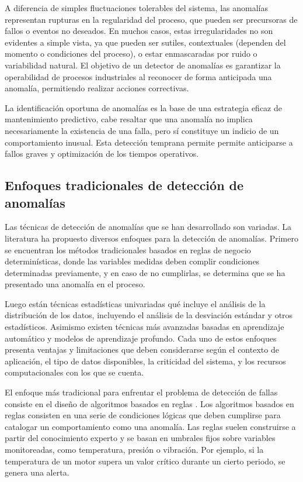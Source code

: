 \documentclass[11pt,a4paper,spanish]{book}
\numberwithin{equation}{chapter}
\numberwithin{figure}{chapter}
\begin{document}
A diferencia de simples fluctuaciones tolerables del sistema, las anomalías 
representan rupturas en la regularidad del proceso, que pueden ser precursoras de 
fallos o eventos no deseados. En muchos casos, estas irregularidades no son evidentes 
a simple vista, ya que pueden ser sutiles, contextuales (dependen del momento o 
condiciones del proceso), o estar enmascaradas por ruido o variabilidad natural.
El objetivo de un detector de anomalías es garantizar la operabilidad de procesos 
industriales al reconocer de forma anticipada una anomalía, permitiendo realizar 
acciones correctivas. 


La identificación oportuna de anomalías es la base de una estrategia eficaz de 
mantenimiento predictivo, cabe resaltar que una anomalía no implica necesariamente
la existencia de una falla, pero sí constituye un indicio de un comportamiento inusual.
Esta detección temprana permite permite anticiparse a fallos graves y optimización de 
los tiempos operativos.

\subsection{Enfoques tradicionales de detección de anomalías}

Las técnicas de detección de anomalías que se han desarrollado son variadas. 
La literatura ha propuesto diversos enfoques para la detección de anomalías. 
Primero se encuentran los métodos tradicionales basados en reglas de negocio 
determinísticas, donde las variables medidas deben complir condiciones determinadas 
previamente, y en caso de no cumplirlas, se determina que se ha presentado una anomalía 
en el proceso. 


Luego están técnicas estadísticas univariadas qué incluye el análisis de la 
distribución de los datos, incluyendo el análisis de la desviación estándar y otros 
estadísticos. 
Asimismo existen técnicas más avanzadas basadas en aprendizaje automático y modelos de 
aprendizaje profundo. 
Cada uno de estos enfoques presenta ventajas y limitaciones que deben considerarse según 
el contexto de aplicación, el tipo de datos disponibles, la criticidad del sistema, y los 
recursos computacionales con los que se cuenta.


El enfoque más tradicional para enfrentar el problema de detección de fallas consiste en 
el diseño de algoritmos basados en reglas \cite{gami2024datacleansing}. Los algoritmos 
basados en reglas consisten en una serie de condiciones lógicas que deben cumplirse para
catalogar un comportamiento como una anomalía. 
Las reglas suelen construirse a partir del 
conocimiento experto y se basan en umbrales fijos sobre variables monitoreadas, como 
temperatura, presión o vibración. Por ejemplo, si la temperatura de un motor supera un 
valor crítico durante un cierto periodo, se genera una alerta. 
\end{document}

